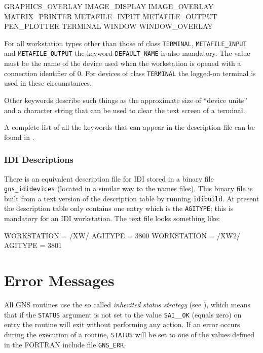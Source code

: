 \documentclass[twoside,11pt,nolof]{starlink}
\begin{document}
\begin{terminalv}
GRAPHICS_OVERLAY
IMAGE_DISPLAY
IMAGE_OVERLAY
MATRIX_PRINTER
METAFILE_INPUT
METAFILE_OUTPUT
PEN_PLOTTER
TERMINAL
WINDOW
WINDOW_OVERLAY
\end{terminalv}

For all workstation types other than those of class \texttt{TERMINAL}, \texttt{METAFILE\_\-INPUT} and \texttt{METAFILE\_\-OUTPUT} the keyword \texttt{DEFAULT\_NAME} is also mandatory. The value must be the name of the
device used when the workstation is opened with a connection identifier of
0. For devices of class \texttt{TERMINAL} the logged-on terminal is used in
these circumstances.

Other keywords describe such things as the
approximate size of ``device units'' and a character string that can be
used to clear the text screen of a terminal.

A complete list of all the keywords that can appear in the description file
can be found in .

\subsubsection{IDI Descriptions}

There is an equivalent description file for IDI stored in a binary file
\texttt{gns\_ididevices} (located in a similar way to the names files).
This binary file is built from a text version of the description table by
running \texttt{idibuild}. At present the description table only
contains one entry which is the \texttt{AGITYPE}; this is mandatory for an IDI
workstation. The text file looks something like:

\begin{terminalv}
WORKSTATION = /XW/
  AGITYPE = 3800
WORKSTATION = /XW2/
  AGITYPE = 3801
\end{terminalv}

\section{Error Messages}\label{er}

All GNS routines use the so called \emph{inherited status strategy}
(see ), which means
that if the \texttt{STATUS} argument is not set to the value \texttt{SAI\_\_OK}
(equals zero) on entry the routine will exit without performing any action. If
an error occurs during the execution of a routine, \texttt{STATUS} will be set to
one of the values defined in the FORTRAN include file \texttt{GNS\_ERR}.
\end{document}
